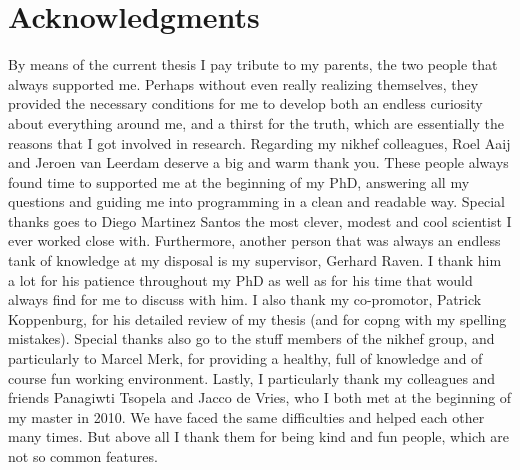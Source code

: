 \chapter*{Acknowledgments}
\chaptermark{}

By means of the current thesis I pay tribute to my parents, the two people that always
supported me. Perhaps without even really realizing themselves, they provided the necessary conditions
for me to develop both an endless curiosity about everything around me, and a thirst for the truth,
which are essentially the reasons that I got involved in research. Regarding my nikhef colleagues,
Roel Aaij and Jeroen van Leerdam deserve a big and warm thank you. These people always found time to
supported me at the beginning of my PhD, answering all my questions and guiding me into programming in
a clean and readable way. Special thanks goes to Diego Martinez Santos the most clever, modest
and cool scientist I ever worked close with. Furthermore, another person that was always an endless
tank of knowledge at my disposal is my supervisor, Gerhard Raven. I thank him a lot for his patience
throughout my PhD as well as for his time that would always find for me to discuss with him.
I also thank my co-promotor, Patrick Koppenburg, for his detailed review of my thesis (and for
copng with my spelling mistakes). Special thanks also go to the stuff members of the nikhef
\lhcb group, and particularly to Marcel Merk, for providing a healthy, full of knowledge and of
course fun working environment. Lastly, I particularly thank my colleagues and friends Panagiwti
Tsopela and Jacco de Vries, who I both met at the beginning of my master in 2010. We have
faced the same difficulties and helped each other many times. But above all I thank them for
being kind and fun people, which are not so common features.
